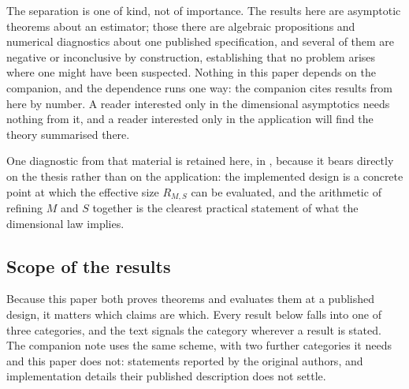 \documentclass[11pt]{article}
\theoremstyle{definition}
\begin{document}
The separation is one of kind, not of importance. The results here are asymptotic theorems about an estimator; those there are algebraic propositions and numerical diagnostics about one published specification, and several of them are negative or inconclusive by construction, establishing that no problem arises where one might have been suspected. Nothing in this paper depends on the companion, and the dependence runs one way: the companion cites results from here by number. A reader interested only in the dimensional asymptotics needs nothing from it, and a reader interested only in the application will find the theory summarised there.

One diagnostic from that material is retained here, in , because it bears directly on the thesis rather than on the application: the implemented design is a concrete point at which the effective size $R_{M,S}$ can be evaluated, and the arithmetic of refining $M$ and $S$ together is the clearest practical statement of what the dimensional law implies.

\subsection{Scope of the results}\label{sec:scope}

Because this paper both proves theorems and evaluates them at a published design, it matters which claims are which. Every result below falls into one of three categories, and the text signals the category wherever a result is stated. The companion note uses the same scheme, with two further categories it needs and this paper does not: statements reported by the original authors, and implementation details their published description does not settle.
\end{document}
